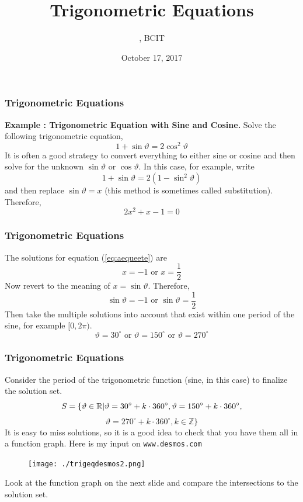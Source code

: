 \documentclass[xcolor=dvipsnames]{beamer}
\title{Trigonometric Equations}
\subtitle{{\CourseNumber}, BCIT}
\author{\CourseName}
\date{October 17, 2017}
\newcounter{expls}
\newcommand{\beispiel}[1]{\refstepcounter{expls}\textbf{Example \arabic{expls}: #1.}}
\begin{document}
\begin{frame}
  \titlepage
\end{frame}

\begin{frame}
  \frametitle{Trigonometric Equations}
\beispiel{Trigonometric Equation with Sine and Cosine} Solve the following trigonometric equation,
\begin{equation}
  \label{eq:yeobidae}
  1+\sin\vartheta=2\cos^{2}\vartheta
\end{equation}  
It is often a good strategy to convert everything to either sine or
cosine and then solve for the unknown $\sin\vartheta$ or
$\cos\vartheta$. In this case, for example, write
\begin{equation}
  \label{eq:aegovatu}
  1+\sin\vartheta=2(1-\sin^{2}\vartheta)
\end{equation}
and then replace $\sin\vartheta=x$ (this method is sometimes called
substitution). Therefore,
\begin{equation}
  \label{eq:aequeete}
2x^{2}+x-1=0  
\end{equation}
\end{frame}

\begin{frame}
  \frametitle{Trigonometric Equations}
  The solutions for equation (\ref{eq:aequeete}) are
  \begin{equation}
    \label{eq:koshoepi}
    x=-1\mbox{ or }x=\frac{1}{2}
  \end{equation}
  Now revert to the meaning of $x=\sin\vartheta$. Therefore,
  \begin{equation}
    \label{eq:hutahkig}
    \sin\vartheta=-1\mbox{ or }\sin\vartheta=\frac{1}{2}
  \end{equation}
Then take the multiple solutions into account that exist within one period
of the sine, for example $[0,2\pi)$.
\begin{equation}
  \label{eq:ciowoowu}
  \vartheta=30^{\circ}\mbox{ or }\vartheta=150^{\circ}\mbox{ or }\vartheta=270^{\circ}
\end{equation}
\end{frame}

\begin{frame}
  \frametitle{Trigonometric Equations}
Consider the period of the trigonometric function (sine, in
this case) to finalize the solution set.
\begin{equation}
  \label{eq:phahchoh}
  S=\{\vartheta\in\mathbb{R}|\vartheta=30^{\circ}+k\cdot{}360^{\circ},\vartheta=150^{\circ}+k\cdot{}360^{\circ},\notag
\end{equation}
\begin{equation}
  \label{eq:rerushao}
  \vartheta=270^{\circ}+k\cdot{}360^{\circ},k\in\mathbb{Z}\}
\end{equation}
It is easy to miss solutions, so it is a good idea to check that you
have them all in a function graph. Here is my input on
\texttt{www.desmos.com}
  \begin{figure}[h]
    \texttt{[image: ./trigeqdesmos2.png]}
  \end{figure}
  Look at the function graph on the next slide and compare the
  intersections to the solution set.
\end{frame}
\end{document}
